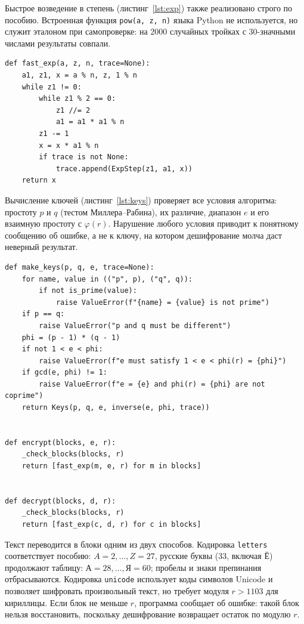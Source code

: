 \documentclass[14pt,a4paper]{extarticle}
\begin{document}
Быстрое возведение в степень (листинг~\ref{lst:exp}) также реализовано строго по
пособию. Встроенная функция \texttt{pow(a, z, n)} языка Python не используется,
но служит эталоном при самопроверке: на 2000 случайных тройках с 30-значными числами
результаты совпали.

\begin{lstlisting}[style=python, caption={Быстрое возведение в степень по модулю}, label={lst:exp}]
def fast_exp(a, z, n, trace=None):
    a1, z1, x = a % n, z, 1 % n
    while z1 != 0:
        while z1 % 2 == 0:
            z1 //= 2
            a1 = a1 * a1 % n
        z1 -= 1
        x = x * a1 % n
        if trace is not None:
            trace.append(ExpStep(z1, a1, x))
    return x
\end{lstlisting}

Вычисление ключей (листинг~\ref{lst:keys}) проверяет все условия алгоритма: простоту
$p$ и $q$ (тестом Миллера--Рабина), их различие, диапазон $e$ и его взаимную простоту
с $\varphi(r)$. Нарушение любого условия приводит к понятному сообщению об ошибке,
а не к ключу, на котором дешифрование молча даст неверный результат.

\begin{lstlisting}[style=python, caption={Вычисление пары ключей}, label={lst:keys}]
def make_keys(p, q, e, trace=None):
    for name, value in (("p", p), ("q", q)):
        if not is_prime(value):
            raise ValueError(f"{name} = {value} is not prime")
    if p == q:
        raise ValueError("p and q must be different")
    phi = (p - 1) * (q - 1)
    if not 1 < e < phi:
        raise ValueError(f"e must satisfy 1 < e < phi(r) = {phi}")
    if gcd(e, phi) != 1:
        raise ValueError(f"e = {e} and phi(r) = {phi} are not coprime")
    return Keys(p, q, e, inverse(e, phi, trace))


def encrypt(blocks, e, r):
    _check_blocks(blocks, r)
    return [fast_exp(m, e, r) for m in blocks]


def decrypt(blocks, d, r):
    _check_blocks(blocks, r)
    return [fast_exp(c, d, r) for c in blocks]
\end{lstlisting}

Текст переводится в блоки одним из двух способов. Кодировка \texttt{letters}
соответствует пособию: $A = 2, \dots, Z = 27$, русские буквы (33, включая Ё)
продолжают таблицу: $\text{А} = 28, \dots, \text{Я} = 60$; пробелы и знаки препинания
отбрасываются. Кодировка \texttt{unicode} использует коды символов Unicode и позволяет
шифровать произвольный текст, но требует модуля $r > 1103$ для кириллицы. Если блок
не меньше $r$, программа сообщает об ошибке: такой блок нельзя восстановить, поскольку
дешифрование возвращает остаток по модулю $r$.
\end{document}

